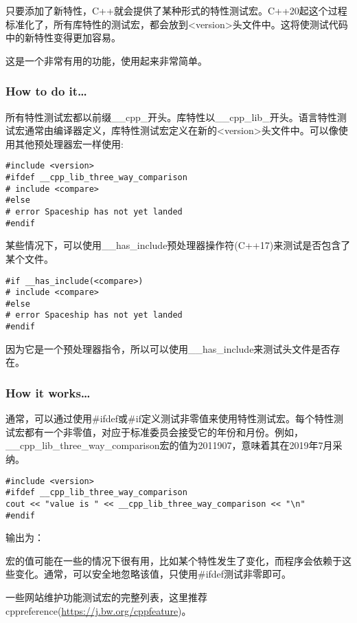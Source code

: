 
只要添加了新特性，C++就会提供了某种形式的特性测试宏。C++20起这个过程标准化了，所有库特性的测试宏，都会放到<version>头文件中。这将使测试代码中的新特性变得更加容易。

这是一个非常有用的功能，使用起来非常简单。

\subsubsection{How to do it…}

所有特性测试宏都以前缀\_\_cpp\_开头。库特性以\_\_cpp\_lib\_开头。语言特性测试宏通常由编译器定义，库特性测试宏定义在新的<version>头文件中。可以像使用其他预处理器宏一样使用:

\begin{lstlisting}[style=styleCXX]
#include <version>
#ifdef __cpp_lib_three_way_comparison
# include <compare>
#else
# error Spaceship has not yet landed
#endif
\end{lstlisting}

某些情况下，可以使用\_\_has\_include预处理器操作符(C++17)来测试是否包含了某个文件。

\begin{lstlisting}[style=styleCXX]
#if __has_include(<compare>)
# include <compare>
#else
# error Spaceship has not yet landed
#endif
\end{lstlisting}

因为它是一个预处理器指令，所以可以使用\_\_has\_include来测试头文件是否存在。

\subsubsection{How it works…}

通常，可以通过使用\#ifdef或\#if定义测试非零值来使用特性测试宏。每个特性测试宏都有一个非零值，对应于标准委员会接受它的年份和月份。例如，\_\_cpp\_lib\_three\_way\_comparison宏的值为2011907，意味着其在2019年7月采纳。

\begin{lstlisting}[style=styleCXX]
#include <version>
#ifdef __cpp_lib_three_way_comparison
cout << "value is " << __cpp_lib_three_way_comparison << "\n"
#endif
\end{lstlisting}

输出为：


宏的值可能在一些的情况下很有用，比如某个特性发生了变化，而程序会依赖于这些变化。通常，可以安全地忽略该值，只使用\#ifdef测试非零即可。

一些网站维护功能测试宏的完整列表，这里推荐cppreference(\url{https://j.bw.org/cppfeature})。








